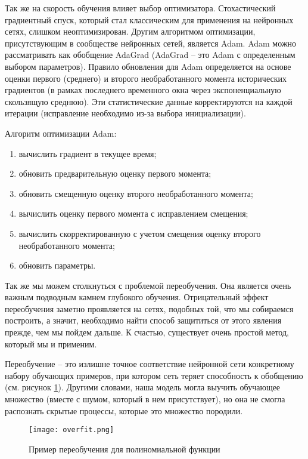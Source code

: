 Так же на скорость обучения влияет выбор оптимизатора. Стохастический градиентный спуск, который стал классическим для применения на нейронных сетях, слишком неоптимизирован. Другим алгоритмом оптимизации, присутствующим в сообществе нейронных сетей, является Adam. Adam можно рассматривать как обобщение AdaGrad (AdaGrad -- это Adam с определенным выбором параметров). Правило обновления для Adam определяется на основе оценки первого (среднего) и второго необработанного момента исторических градиентов (в рамках последнего временного окна через экспоненциальную скользящую среднюю). Эти статистические данные корректируются на каждой итерации (исправление необходимо из-за выбора инициализации).

Алгоритм оптимизации Adam:
\begin{enumerate}
  \item вычислить градиент в текущее время;
  \item обновить предварительную оценку первого момента;
  \item обновить смещенную оценку второго необработанного момента;
  \item вычислить оценку первого момента с исправлением смещения;
  \item вычислить скорректированную с учетом смещения оценку второго необработанного момента;
  \item обновить параметры.
\end{enumerate}

Так же мы можем столкнуться с проблемой переобучения. Она является очень важным подводным камнем глубокого обучения. Отрицательный эффект переобучения заметно проявляется на сетях, подобных той, что мы собираемся построить, а значит, необходимо найти способ защититься от этого явления прежде, чем мы пойдем дальше. К счастью, существует очень простой метод, который мы и применим.

Переобучение -- это излишне точное соответствие нейронной сети конкретному набору обучающих примеров, при котором сеть теряет способность к обобщению (см. рисунок \ref{sec:design:network:overfit}). Другими словами, наша модель могла выучить обучающее множество (вместе с шумом, который в нем присутствует), но она не смогла распознать скрытые процессы, которые это множество породили.

\begin{figure}[h]
\centering
	\texttt{[image: overfit.png]}
	\caption{Пример переобучения для полиномиальной функции}
	\label{sec:design:network:overfit}
\end{figure}

